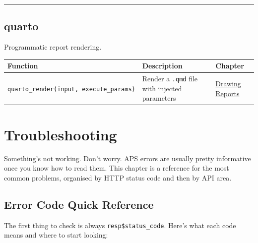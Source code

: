 \documentclass[
  11pt,
  letterpaper,
  DIV=11,
  numbers=noendperiod]{scrreprt}
\begin{document}
\begin{center}\rule{0.5\linewidth}{0.5pt}\end{center}

\section{quarto}\label{quarto}

Programmatic report rendering.

\begin{longtable}[]{@{}
  >{\raggedright\arraybackslash}p{}
  >{\raggedright\arraybackslash}p{}
  >{\raggedright\arraybackslash}p{}@{}}
\toprule\noalign{}
\begin{minipage}[b]{\linewidth}\raggedright
Function
\end{minipage} & \begin{minipage}[b]{\linewidth}\raggedright
Description
\end{minipage} & \begin{minipage}[b]{\linewidth}\raggedright
Chapter
\end{minipage} \\
\midrule\noalign{}
\endhead
\bottomrule\noalign{}
\endlastfoot
\texttt{quarto\_render(input,\ execute\_params)} & Render a
\texttt{.qmd} file with injected parameters &
\hyperref[automated-drawing-reports]{Drawing Reports} \\
\end{longtable}

\chapter{Troubleshooting}\label{troubleshooting}

Something's not working. Don't worry. APS errors are usually pretty
informative once you know how to read them. This chapter is a reference
for the most common problems, organised by HTTP status code and then by
API area.

\section{Error Code Quick Reference}\label{error-code-quick-reference}

The first thing to check is always \texttt{resp\$status\_code}. Here's
what each code means and where to start looking:
\end{document}
